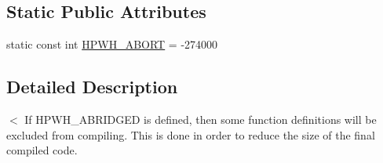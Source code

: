 \subsection*{Static Public Attributes}
\begin{DoxyCompactItemize}
\item 
static const int \hyperlink{class_h_p_w_h_a727a9e272cf7ac3564ebd67bfb8ed063}{H\-P\-W\-H\-\_\-\-A\-B\-O\-R\-T} = -\/274000
\end{DoxyCompactItemize}


\subsection{Detailed Description}
$<$ If H\-P\-W\-H\-\_\-\-A\-B\-R\-I\-D\-G\-E\-D is defined, then some function definitions will be excluded from compiling. This is done in order to reduce the size of the final compiled code. 

